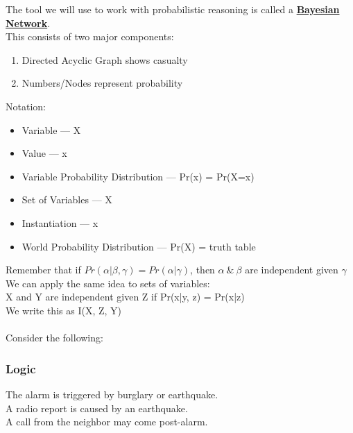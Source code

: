 \documentclass[../../lecture_notes.tex]{subfiles}
\begin{document}
\noindent The tool we will use to work with probabilistic reasoning is called a \textbf{\underline{Bayesian Network}}.\\
This consists of two major components:
\begin{enumerate} [itemsep=0mm]
	\item Directed Acyclic Graph shows casualty
	\item Numbers/Nodes represent probability
\end{enumerate}
\noindent Notation:
\begin{itemize} [itemsep=0mm]
	\item Variable — X
	\item Value — x
	\item Variable Probability Distribution — Pr(x) = Pr(X=x)
	\item Set of Variables — X
	\item Instantiation — x
	\item World Probability Distribution — Pr(X) = truth table
\end{itemize} \medskip

\noindent Remember that if $Pr(\alpha|\beta, \gamma) = Pr(\alpha|\gamma)$, 
	then $\alpha\ \&\ \beta$ are independent given $\gamma$\\
We can apply the same idea to sets of variables:\\
	\indent X and Y are independent given Z if Pr(x|y, z) = Pr(x|z)\\
	\indent We write this as I(X, Z, Y)\\
\\
Consider the following:
\begin{center}\end{center}

\subsubsection*{Logic}
\noindent The alarm is triggered by burglary or earthquake.\\
A radio report is caused by an earthquake.\\
A call from the neighbor may come post-alarm.
\end{document}
